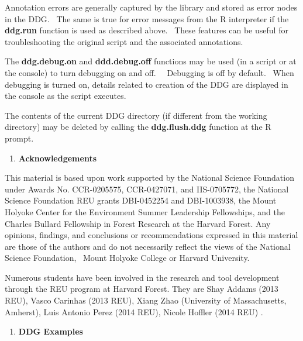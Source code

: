 \documentclass[letterpaper]{article}
\newcounter{saveenum}
\newcommand\liststyleWWNumxv{%
\renewcommand\theenumi{\arabic{enumi}}
\renewcommand\theenumii{\alph{enumii}}
\renewcommand\theenumiii{\alph{enumii}.\roman{enumiii}}
\renewcommand\theenumiv{\alph{enumii}.\roman{enumiii}.\arabic{enumiv}}
\renewcommand\labelenumi{\theenumi.}
\renewcommand\labelenumii{\theenumii.}
\renewcommand\labelenumiii{\theenumiii.}
\renewcommand\labelenumiv{\theenumiv.}
}
\begin{document}
\bigskip

Annotation errors are generally captured by the library and stored as error nodes in the DDG. \ The same is true for error messages from the R interpreter if the \textbf{ddg.run} function is used as described above. \ These features can be useful for troubleshooting the original script and the associated annotations.


\bigskip

The \textbf{ddg.debug.on} and \textbf{ddd.debug.off} functions may be used (in a script or at the console) to turn debugging on and off. \ \ Debugging is off by default. \ When debugging is turned on, details related to creation of the DDG are displayed in the console as the script executes.


\bigskip

The contents of the current DDG directory (if different from the working directory) may be deleted by calling the \textbf{ddg.flush.ddg} function at the R prompt.


\bigskip

\liststyleWWNumxv
\setcounter{saveenum}{\value{enumi}}
\begin{enumerate}
\setcounter{enumi}{\value{saveenum}}
\item \textbf{Acknowledgements}
\end{enumerate}

{\mdseries\upshape\color{black}
This material is based upon work supported by the National Science Foundation under Awards No. CCR-0205575, CCR-0427071, and IIS-0705772, the National Science Foundation REU grants DBI-0452254 and DBI-1003938, the Mount Holyoke Center for the Environment Summer Leadership Fellowships, and the Charles Bullard Fellowship in Forest Research at the Harvard Forest. Any opinions, findings, and conclusions or recommendations expressed in this material are those of the authors and do not necessarily reflect the views of the National Science Foundation, \ Mount Holyoke College or Harvard University.}

{\mdseries\upshape\color{black}
Numerous students have been involved in the research and tool development through the REU program at Harvard Forest. They are Shay Addams (2013 REU), Vasco Carinhas (2013 REU), Xiang Zhao (University of Massachusetts, Amherst), Luis Antonio Perez (2014 REU), Nicole Hoffler (2014 REU) .}


\bigskip

\liststyleWWNumxv
\setcounter{saveenum}{\value{enumi}}
\begin{enumerate}
\setcounter{enumi}{\value{saveenum}}
\item \clearpage
\textbf{DDG Examples}
\end{enumerate}
\end{document}
